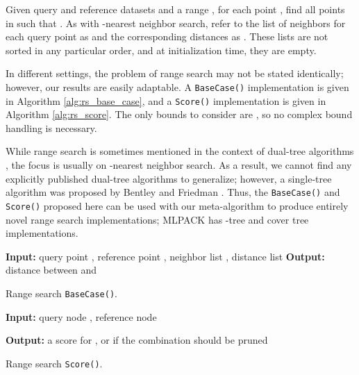 \documentclass{article}
\begin{document}
\vspace*{-0.1em}
Given query and reference datasets  and a range , for each point , find all points in  such that
.  As with -nearest neighbor
search, refer to the list of neighbors for each query point  as 
and the corresponding distances as .  These lists are not sorted in any
particular order, and at initialization time, they are empty.

\vspace*{-0.1em}
In different settings, the problem of range search may not be stated
identically; however, our results are easily adaptable.  A \texttt{BaseCase()}
implementation is given in Algorithm \ref{alg:rs_base_case}, and a
\texttt{Score()} implementation is given in Algorithm \ref{alg:rs_score}.  The
only bounds to consider are , so no complex bound handling
is necessary.

\vspace*{-0.1em}
While range search is sometimes mentioned in the context of
dual-tree algorithms \cite{nbody}, the focus is usually on -nearest neighbor
search.  As a result, we cannot find any explicitly published dual-tree
algorithms to generalize; however, a single-tree algorithm was proposed by
Bentley and Friedman .  Thus, the \texttt{BaseCase()}
and \texttt{Score()} proposed here can be used with our meta-algorithm to
produce entirely novel range search implementations; MLPACK has -tree and
cover tree implementations.

\begin{algorithm}[tb]
  \begin{algorithmic}
    \STATE \textbf{Input:} query point , reference point , neighbor list
, distance list 
    \STATE \textbf{Output:} distance  between  and 
    \medskip
    \STATE 
    \medskip
       \STATE 
       \STATE 
     \ENDIF
     \RETURN 
  \end{algorithmic}
  \caption{Range search \texttt{BaseCase()}.}
  \label{alg:rs_base_case}
\end{algorithm}

\begin{algorithm}[tb]
  \begin{algorithmic}
    \STATE \textbf{Input:} query node , reference node

    \STATE \textbf{Output:} a score for , or
 if the combination should be pruned
    \medskip
    \IF{}
      \RETURN 
    \ENDIF
    \RETURN 
  \end{algorithmic}
  \caption{Range search \texttt{Score()}.}
  \label{alg:rs_score}
\end{algorithm}
\end{document}
